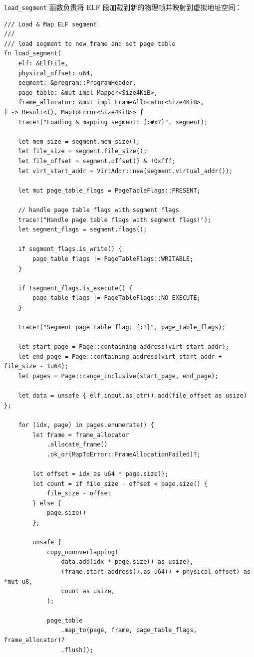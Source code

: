 \documentclass{SYSUReport}
\begin{document}
\begin{enumerate}[label={\chinese*、},labelsep=0pt, start=2]
    \texttt{load\_segment} 函数负责将 ELF 段加载到新的物理帧并映射到虚拟地址空间：

    \begin{verbatim}
/// Load & Map ELF segment
///
/// load segment to new frame and set page table
fn load_segment(
    elf: &ElfFile,
    physical_offset: u64,
    segment: &program::ProgramHeader,
    page_table: &mut impl Mapper<Size4KiB>,
    frame_allocator: &mut impl FrameAllocator<Size4KiB>,
) -> Result<(), MapToError<Size4KiB>> {
    trace!("Loading & mapping segment: {:#x?}", segment);

    let mem_size = segment.mem_size();
    let file_size = segment.file_size();
    let file_offset = segment.offset() & !0xfff;
    let virt_start_addr = VirtAddr::new(segment.virtual_addr());

    let mut page_table_flags = PageTableFlags::PRESENT;

    // handle page table flags with segment flags
    trace!("Handle page table flags with segment flags!");
    let segment_flags = segment.flags();

    if segment_flags.is_write() {
        page_table_flags |= PageTableFlags::WRITABLE;
    }

    if !segment_flags.is_execute() {
        page_table_flags |= PageTableFlags::NO_EXECUTE;
    }

    trace!("Segment page table flag: {:?}", page_table_flags);

    let start_page = Page::containing_address(virt_start_addr);
    let end_page = Page::containing_address(virt_start_addr + file_size - 1u64);
    let pages = Page::range_inclusive(start_page, end_page);

    let data = unsafe { elf.input.as_ptr().add(file_offset as usize) };

    for (idx, page) in pages.enumerate() {
        let frame = frame_allocator
            .allocate_frame()
            .ok_or(MapToError::FrameAllocationFailed)?;

        let offset = idx as u64 * page.size();
        let count = if file_size - offset < page.size() {
            file_size - offset
        } else {
            page.size()
        };

        unsafe {
            copy_nonoverlapping(
                data.add(idx * page.size() as usize),
                (frame.start_address().as_u64() + physical_offset) as *mut u8,
                count as usize,
            );

            page_table
                .map_to(page, frame, page_table_flags, frame_allocator)?
                .flush();


\end{verbatim}
\end{enumerate}
\end{document}
